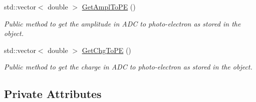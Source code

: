 \begin{DoxyCompactItemize}
std\+::vector$<$ double $>$ \hyperlink{classISiPM_af4f61eeb6e0be8e5c291b3a2407746e8}{Get\+Ampl\+To\+PE} ()
\begin{DoxyCompactList}\small\item\em Public method to get the amplitude in A\+DC to photo-\/electron as stored in the object. \end{DoxyCompactList}\item 
std\+::vector$<$ double $>$ \hyperlink{classISiPM_ab6246048aee23e50fe66262dde6a6e78}{Get\+Chg\+To\+PE} ()
\begin{DoxyCompactList}\small\item\em Public method to get the charge in A\+DC to photo-\/electron as stored in the object. \end{DoxyCompactList}\end{DoxyCompactItemize}
\subsection*{Private Attributes}
